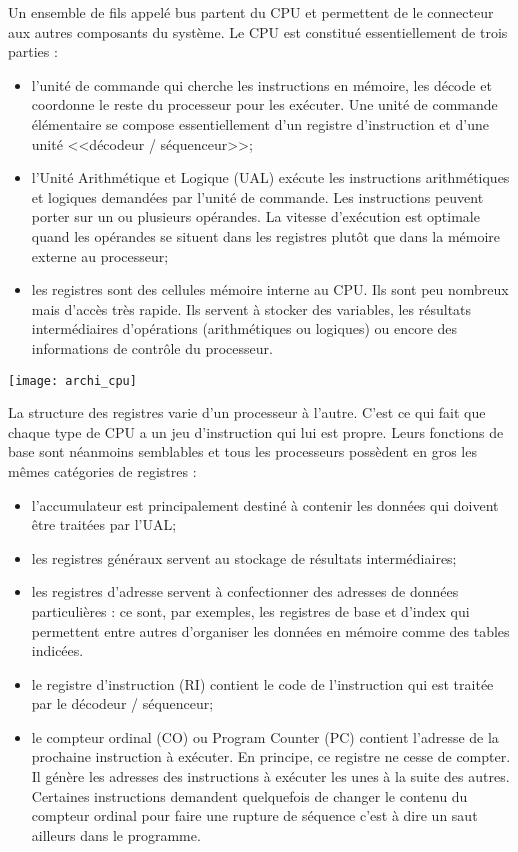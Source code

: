 Un ensemble de fils appelé bus partent du CPU et permettent de le connecteur aux autres composants du système.
Le CPU est constitué essentiellement de trois parties :
\begin{itemize}
\item l'unité de commande qui cherche les instructions en mémoire, les décode et coordonne le
reste du processeur pour les exécuter. Une unité de commande élémentaire se compose
essentiellement d'un registre d'instruction et d'une unité <<décodeur / séquenceur>>;
\item l'Unité Arithmétique et Logique (UAL) exécute les instructions arithmétiques et logiques
demandées par l'unité de commande. Les instructions peuvent porter sur un ou plusieurs
opérandes. La vitesse d'exécution est optimale quand les opérandes se situent dans les
registres plutôt que dans la mémoire externe au processeur;
\item les registres sont des cellules mémoire interne au CPU. Ils sont peu nombreux mais d'accès
très rapide. Ils servent à stocker des variables, les résultats intermédiaires d'opérations
(arithmétiques ou logiques) ou encore des informations de contrôle du processeur.

\end{itemize}


\begin{center}
\texttt{[image: archi\_cpu]}
\end{center}

La structure des registres varie d'un processeur à l'autre. C'est ce qui fait que chaque type de CPU a un jeu d'instruction qui lui est propre. Leurs fonctions de base sont néanmoins
semblables et tous les processeurs possèdent en gros les mêmes catégories de registres :
\begin{itemize}
\item l'accumulateur est principalement destiné à contenir les données qui doivent être
traitées par l'UAL;
\item les registres généraux servent au stockage de résultats intermédiaires;
\item les registres d’adresse servent à confectionner des adresses de données
particulières : ce sont, par exemples, les registres de base et d'index qui permettent
entre autres d'organiser les données en mémoire comme des tables indicées.
\item le registre d'instruction (RI) contient le code de l'instruction qui est traitée par le
décodeur / séquenceur;
\item le compteur ordinal (CO) ou Program Counter (PC) contient l'adresse de la
prochaine instruction à exécuter. En principe, ce registre ne cesse de compter. Il
génère les adresses des instructions à exécuter les unes à la suite des autres.
Certaines instructions demandent quelquefois de changer le contenu du compteur
ordinal pour faire une rupture de séquence c'est à dire un saut ailleurs dans le
programme.
\end{itemize}


